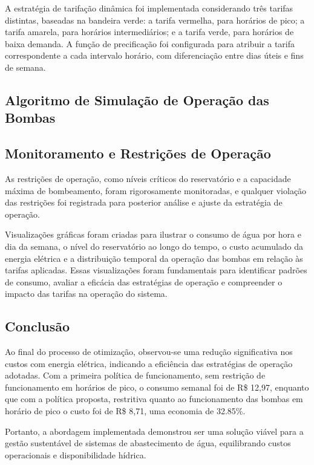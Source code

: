A estratégia de tarifação dinâmica foi implementada considerando três tarifas distintas, baseadas na bandeira verde: a tarifa vermelha, para horários de pico; a tarifa amarela, para horários intermediários; e a tarifa verde, para horários de baixa demanda. A função de precificação foi configurada para atribuir a tarifa correspondente a cada intervalo horário, com diferenciação entre dias úteis e fins de semana.


\subsection{Algoritmo de Simulação de Operação das Bombas}


\subsection{Monitoramento e Restrições de Operação}

As restrições de operação, como níveis críticos do reservatório e a capacidade máxima de bombeamento, foram rigorosamente monitoradas, e qualquer violação das restrições foi registrada para posterior análise e ajuste da estratégia de operação.


Visualizações gráficas foram criadas para ilustrar o consumo de água por hora e dia da semana, o nível do reservatório ao longo do tempo, o custo acumulado da energia elétrica e a distribuição temporal da operação das bombas em relação às tarifas aplicadas. Essas visualizações foram fundamentais para identificar padrões de consumo, avaliar a eficácia das estratégias de operação e compreender o impacto das tarifas na operação do sistema.



\subsection{Conclusão}

Ao final do processo de otimização, observou-se uma redução significativa nos custos com energia elétrica, indicando a eficiência das estratégias de operação adotadas. Com a primeira política de funcionamento, sem restrição de funcionamento em horários de pico, o consumo semanal foi de R\$ 12,97, enquanto que com a política proposta, restritiva quanto ao funcionamento das bombas em horário de pico o custo foi de R\$ 8,71, uma economia de 32.85\%.

Portanto, a abordagem implementada demonstrou ser uma solução viável para a gestão sustentável de sistemas de abastecimento de água, equilibrando custos operacionais e disponibilidade hídrica.
